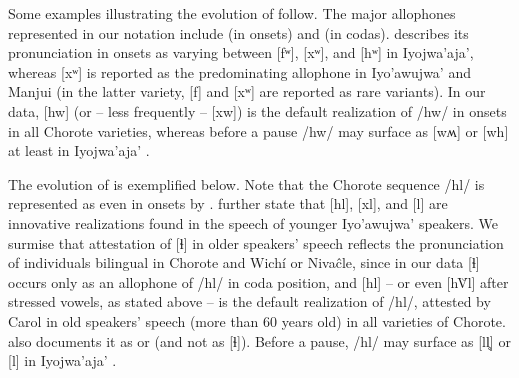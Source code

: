 Some examples illustrating the evolution of  follow. The major allophones represented in our notation include  (in onsets) and  (in codas). \citet[20–21]{AG83} describes its pronunciation in onsets as varying between [fʷ], [xʷ], and [hʷ] in Iyojwa’aja’, whereas [xʷ] is reported as the predominating allophone in Iyo’awujwa’ and Manjui (in the latter variety, [f] and [xʷ] are reported as rare variants). In our data, [hw] (or -- less frequently -- [xw]) is the default realization of /hw/ in onsets in all Chorote varieties, whereas before a pause /hw/ may surface as [wʍ] or [wh] at least in Iyojwa’aja’ \citep[87]{JC14b}.

\begin{exe}
    \ex \wing
    \ex \companion
    \ex \coal
    \ex \disease
    \ex \shoulder
    \ex \shoulderblade
    \ex \firef
    \ex \centipede
    \ex \cutdown
    \ex \algarrobof
    \ex \algarrobot
    \ex \rightn
    \ex \tell
    \ex \sisinlaw
    \ex \soninlaw
    \ex \fieldn
    \ex \flyv
    \ex \mortar
    \ex \rootn
    \ex \notafraid
    \ex \coldweather
    \ex \hidev
    \ex \pocote
    \ex \dreamv
    \ex \dreamn
    \ex \crab
    \ex \ankle
    \ex \throwpush
    \ex \fart
    \ex \neighbor
    \ex \spouse
    \ex \durmili
    \ex \chachalaca
    \ex \acquainted
    \ex \spend
    \ex \suckb
    \ex \tsofa
    \ex \woman
    \ex \ashamedcw
    \ex \pigeon
\end{exe}

The evolution of  is exemplified below. Note that the Chorote sequence /hl/ is represented as  even in onsets by \citet{LC-VG-07}. \citet[628]{LC-VG-10} further state that [hl], [xl], and [l] are innovative realizations found in the speech of younger Iyo’awujwa’ speakers. We surmise that  attestation of [ɬ] in older speakers' speech reflects the pronunciation of individuals bilingual in Chorote and Wichí or Nivaĉle, since in our data [ɬ] occurs only as an allophone of /hl/ in coda position, and [hl] -- or even [hV̆l] after stressed vowels, as stated above -- is the default realization of /hl/, attested by Carol in old speakers' speech (more than 60 years old) in all varieties of Chorote. \citet[26]{AG78,AG79,AG83} also documents it as  or  (and not as [ɬ]). Before a pause, /hl/ may surface as [ll̥] or [l] in Iyojwa’aja’ \citep[87]{JC14b}.

\begin{exe}
    \ex \burn
    \ex \mortar
    \ex \dreamv
    \ex \dreamn
    \ex \breath
    \ex \redquebracho
    \ex \answer
    \ex \flu
    \ex \demlh
    \ex \louse
    \ex {}
    \ex \lightfire
    \ex \firewoodlhet
    \ex \thread
    \ex \yicalhuk
    \ex \daylhuma
    \ex \girl
    \ex \dayworld
    \ex \rain
    \ex \sprout
    \ex \carrysh
    \ex \spinsew
    \ex \silkfloss
    \ex \tired
    \ex \rhea
    \ex \rib
    \ex \climb
    \ex \ask
    \ex \fatalha
    \ex \iguana
    \ex \ashamedcw
    \ex \urinate
    \ex \urine
    \ex \puma
\end{exe}

